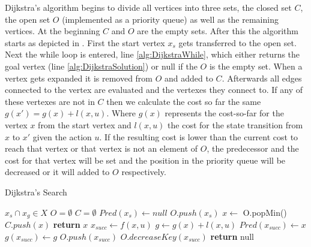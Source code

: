 Dijkstra's algorithm begins to divide all vertices into three sets, the closed set $C$, the open set $O$ (implemented as a priority queue) as well as the remaining vertices. At the beginning $C$ and $O$ are the empty sets. After this the algorithm starts as depicted in  \cite{Dijkstra.1959}. First the start vertex $x_s$ gets transferred to the open set. Next the while loop is entered, line \ref{alg:DijkstraWhile}, which either returns the goal vertex (line \ref{alg:DijkstraSolution}) or null if the $O$ is the empty set. When a vertex gets expanded it is removed from $O$ and added to $C$. Afterwards all edges connected to the vertex are evaluated and the vertexes they connect to. If any of these vertexes are not in $C$ then we calculate the cost so far the same $g(x') = g(x) + l(x,u)$. Where $g(x)$ represents the cost-so-far for the vertex $x$ from the start vertex and $l(x,u)$ the cost for the state transition from $x$ to $x'$ given the action $u$. If the resulting cost is lower than the current cost to reach that vertex or that vertex is not an element of $O$, the predecessor and the cost for that vertex will be set and the position in the priority queue will be decreased or it will added to $O$ respectively. \cite{Dijkstra.1959,LaValle.2006,Cormen.2009} 

\begin{algorithm}
    \caption{Dijkstra's Search}\label{alg:Dijkstra}
    \begin{algorithmic}[1]
        \Require $x_s \cap x_g \in X$
        \State $O = \emptyset$
        \State $C = \emptyset$
        \State $Pred(x_s) \gets null$
        \State $O.push(x_s)$
         \label{alg:DijkstraWhile}
            \State $x \gets$ O.popMin()
            \State $C.push(x)$
                \State \textbf{return} $x$ \label{alg:DijkstraSolution}
            \Else
                \State $x_{succ} \gets f(x,u)$
                        \State $g \gets g(x) + l(x,u)$
                            \State $Pred(x_{succ}) \gets x$
                            \State $g(x_{succ}) \gets g$
                                \State $O.push(x_{succ})$
                            \Else
                                \State $O.decreaseKey(x_{succ})$
                            \EndIf
                        \EndIf
                    \EndIf
                \EndFor
            \EndIf
        \EndWhile
        \State \textbf{return} null
    \end{algorithmic}
\end{algorithm}

